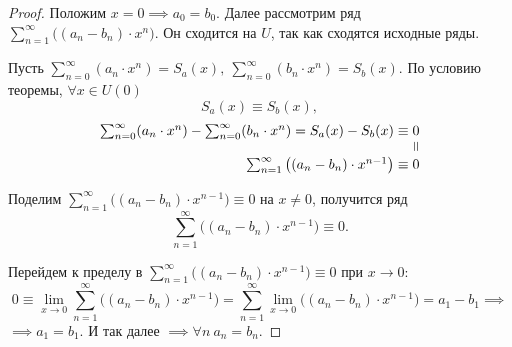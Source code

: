 \begin{proof}
    Положим $x = 0 \implies a_0 = b_0$. Далее рассмотрим ряд $\sum_{n=1}^{\infty}\big((a_n - b_n) \cdot x^n\big)$. Он сходится на $U$, так как сходятся исходные ряды.

    Пусть $\sum_{n=0}^{\infty}(a_n \cdot x^n) = S_a(x), \ \sum_{n=0}^{\infty}(b_n \cdot x^n) = S_b(x)$. По условию теоремы, $\forall x \in U(0) $
    \[
        S_a(x) \equiv S_b(x),
    \]
    \[
        \begin{array}{r}
            \sum_{n=0}^{\infty}(a_n \cdot x^n) - \sum_{n=0}^{\infty}(b_n \cdot x^n) = S_a(x) - S_b(x) \equiv 0 \\
            \verteq                                                                                            \\
            \sum_{n=1}^{\infty}\big((a_n - b_n) \cdot x^{n-1}\big) \equiv 0
        \end{array}
    \]

    Поделим $\sum_{n=1}^{\infty}\big((a_n - b_n) \cdot x^{n-1}\big) \equiv 0$ на $x \ne 0$, получится ряд
    \[
        \sum_{n=1}^{\infty}\big((a_n - b_n) \cdot x^{n-1}\big) \equiv 0.
    \]

    Перейдем к пределу в $\sum_{n=1}^{\infty}\big((a_n - b_n) \cdot x^{n-1}\big) \equiv 0$ при $x \rightarrow 0$:
    \[
        0 \equiv \underset{x\rightarrow0}{\lim}\sum_{n=1}^{\infty}\big((a_n - b_n) \cdot x^{n-1}\big) = \sum_{n=1}^{\infty}\underset{x\rightarrow0}{\lim}\big((a_n - b_n) \cdot x^{n-1} \big) = a_1 - b_1 \implies
    \]
    $\implies a_1 = b_1$. И так далее $\implies \forall n \ a_n = b_n$.
\end{proof}